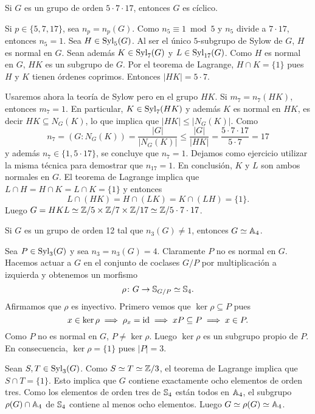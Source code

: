\begin{example}
Si $G$ es un grupo de orden $5\cdot 7\cdot 17$, entonces $G$ es cíclico.

Si $p\in\{5,7,17\}$, sea $n_p=n_p(G)$. Como $n_5\equiv 1\bmod 5$ y $n_5$ divide a $7\cdot 17$, entonces $n_5=1$. Sea $H\in\mathrm{Syl}_5(G)$. Al ser el único $5$-subgrupo de Sylow de $G$, $H$ es normal en $G$. Sean además $K\in\mathrm{Syl}_7(G)$ y $L\in\mathrm{Syl}_{17}(G)$. Como $H$ es normal en $G$, $HK$ es un subgrupo de $G$. Por el teorema de Lagrange, $H\cap K=\{1\}$ pues $H$ y $K$ tienen órdenes coprimos. Entonces $|HK|=5\cdot 7$.   

Usaremos ahora la teoría de Sylow pero en el grupo $HK$. Si $m_7=n_7(HK)$, entonces $m_7=1$. En particular, $K\in\mathrm{Syl}_7(HK)$ y además $K$ es normal en $HK$, es decir
$HK\subseteq N_G(K)$, lo que implica que $|HK|\leq |N_G(K)|$. Como
\[
n_7=(G:N_G(K))=\frac{|G|}{|N_G(K)|}\leq \frac{|G|}{|HK|}=\frac{5\cdot 7\cdot 17}{5\cdot 7}=17
\]
y además $n_7\in\{1,5\cdot 17\}$, se concluye que $n_7=1$. Dejamos como ejercicio utilizar la misma técnica para demostrar que $n_{17}=1$. En conclusión, $K$ y $L$ son ambos normales en $G$. El teorema de Lagrange implica que $L\cap H=H\cap K=L\cap K=\{1\}$ y entonces 
\[
L\cap (HK)=H\cap (LK)=K\cap (LH)=\{1\}.
\]
Luego $G=HKL\simeq\mathbb{Z}/5\times\mathbb{Z}/7\times\mathbb{Z}/17\simeq\mathbb{Z}/5\cdot 7\cdot 17$. 
\end{example}


\begin{example}
Si $G$ es un grupo de orden 12 tal que $n_3(G)\ne1$, entonces $G\simeq\mathbb{A}_4$.

Sea $P\in\mathrm{Syl}_3(G)$ y sea $n_3=n_3(G)=4$. Claramente $P$ no es normal en $G$. Hacemos actuar a $G$ en el conjunto de coclases $G/P$ por multiplicación a izquierda y 
obtenemos un morfismo 
\[
\rho\colon G\to\mathbb{S}_{G/P}\simeq\mathbb{S}_4.
\]
Afirmamos que $\rho$ es inyectivo. Primero vemos que $\ker\rho\subseteq P$ pues 
\[
x\in\ker\rho\implies
\rho_x=\operatorname{id}\implies
xP\subseteq P\implies
x\in P.
\]
Como $P$ no es normal en $G$, $P\ne \ker\rho$. Luego $\ker\rho$ es un subgrupo propio de $P$. En consecuencia, $\ker\rho=\{1\}$ pues $|P|=3$.   

Sean $S,T\in\mathrm{Syl}_3(G)$. Como $S\simeq T\simeq\mathbb{Z}/3$, el teorema de Lagrange implica que $S\cap T=\{1\}$. Esto implica que $G$ contiene exactamente ocho elementos de orden tres. Como los elementos de orden tres de $\mathbb{S}_4$ están todos en $\mathbb{A}_4$, el subgrupo $\rho(G)\cap\mathbb{A}_4$ de $\mathbb{S}_4$ contiene al menos ocho elementos. Luego $G\simeq\rho(G)\simeq\mathbb{A}_4$.  
\end{example}


